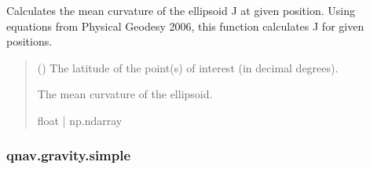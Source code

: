 \documentclass[letterpaper,10pt,english]{sphinxmanual}
\begin{document}

\begin{fulllineitems}
\label{\detokenize{modules/gravity/base:qnav.gravity.base.calculate_curvature}}
\pysigstartsignatures
{}
\pysigstopsignatures
\sphinxAtStartPar
Calculates the mean curvature of the ellipsoid J at given position.
Using equations from Physical Geodesy 2006, this function calculates
J for given positions.
\begin{quote}\begin{description}
\sphinxAtStartPar
{} (\sphinxstyleliteralemphasis{\sphinxupquote{ | }}) \textendash{} The latitude of the point(s) of interest (in decimal degrees).

\sphinxAtStartPar
The mean curvature of the ellipsoid.

\sphinxAtStartPar
float | np.ndarray

\end{description}\end{quote}

\end{fulllineitems}


\sphinxstepscope


\subsubsection{qnav.gravity.simple}
\label{\detokenize{modules/gravity/simple:module-qnav.gravity.simple}}\label{\detokenize{modules/gravity/simple:qnav-gravity-simple}}\label{\detokenize{modules/gravity/simple::doc}}
\end{document}
